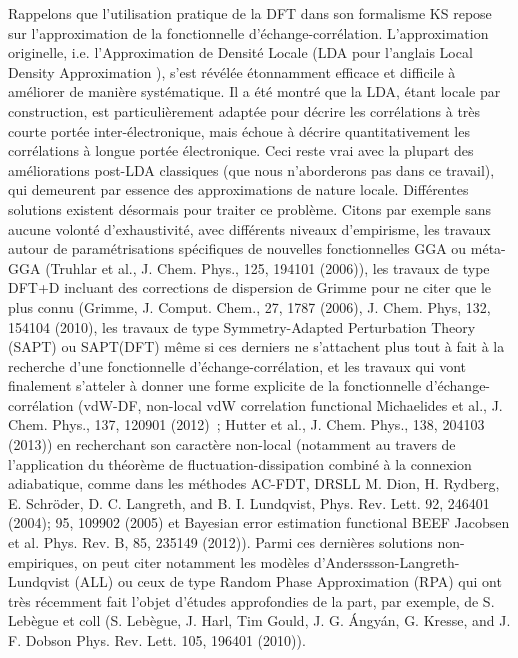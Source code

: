	Rappelons que l’utilisation pratique de la DFT dans son formalisme KS repose sur l’approximation de la fonctionnelle d’échange-corrélation. L’approximation originelle, i.e. l’Approximation de Densité Locale (LDA pour l’anglais \og Local Density Approximation \fg), s’est révélée étonnamment efficace et difficile à améliorer de manière systématique. Il a été montré que la LDA, étant locale par construction, est particulièrement adaptée pour décrire les corrélations à très courte portée inter-électronique, mais échoue à décrire quantitativement les corrélations à longue portée électronique. Ceci reste vrai avec la plupart des améliorations post-LDA classiques (que nous n’aborderons pas dans ce travail), qui demeurent par essence des approximations de nature locale. Différentes solutions existent désormais pour traiter ce problème. Citons par exemple sans aucune volonté d’exhaustivité, avec différents niveaux d’empirisme, les travaux autour de paramétrisations spécifiques de nouvelles fonctionnelles GGA ou méta-GGA (Truhlar et al., J. Chem. Phys., 125, 194101 (2006)), les travaux de type DFT+D incluant des corrections de dispersion de Grimme pour ne citer que le plus connu (Grimme, J. Comput. Chem., 27, 1787 (2006), J. Chem. Phys, 132, 154104 (2010), les travaux de type Symmetry-Adapted Perturbation Theory (SAPT) ou SAPT(DFT) même si ces derniers ne s’attachent plus tout à fait à la recherche d’une fonctionnelle d’échange-corrélation, et les travaux qui vont finalement s’atteler à donner une forme explicite de la fonctionnelle d’échange-corrélation (vdW-DF, non-local vdW correlation functional Michaelides et al., J. Chem. Phys., 137, 120901 (2012) ; Hutter et al., J. Chem. Phys., 138, 204103 (2013)) en recherchant son caractère non-local (notamment au travers de l’application du théorème de fluctuation-dissipation combiné à la connexion adiabatique, comme dans les méthodes AC-FDT, DRSLL M. Dion, H. Rydberg, E. Schröder, D. C. Langreth, and B. I. Lundqvist, Phys. Rev. Lett. 92, 246401 (2004); 95, 109902 (2005) et Bayesian error estimation functional BEEF Jacobsen et al. Phys. Rev. B, 85, 235149 (2012)). Parmi ces dernières solutions non-empiriques, on peut citer notamment les modèles d’Anderssson-Langreth-Lundqvist (ALL) ou ceux de type Random Phase Approximation (RPA) qui ont très récemment fait l’objet d’études approfondies de la part, par exemple, de S. Lebègue et coll (S. Lebègue, J. Harl, Tim Gould, J. G. Ángyán, G. Kresse, and J. F. Dobson Phys. Rev. Lett. 105, 196401 (2010)).\\
	
